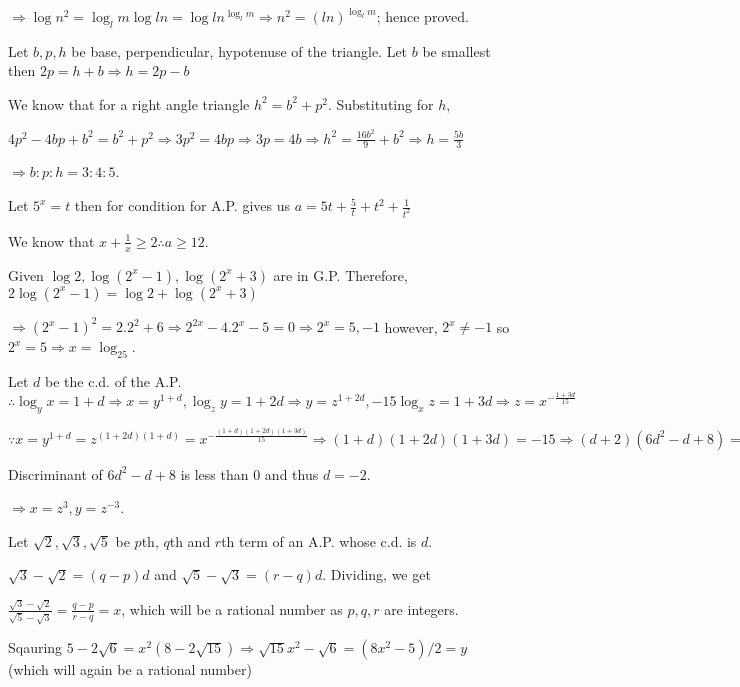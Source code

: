   $\Rightarrow \log n^2 = \log_lm\log ln = \log ln^{\log_lm} \Rightarrow n^2 = (ln)^{\log_lm}$; hence
  proved.
\item Let $b, p, h$ be base, perpendicular, hypotenuse of the triangle. Let $b$ be smallest then $2p = h +
  b \Rightarrow h = 2p - b$

  We know that for a right angle triangle $h^2 = b^2 + p^2$. Substituting for $h$,

  $4p^2 - 4bp + b^2 = b^2 + p^2 \Rightarrow 3p^2 = 4bp \Rightarrow 3p = 4b \Rightarrow h^2 = \frac{16b^2}{9}
  + b^2 \Rightarrow h = \frac{5b}{3}$

  $\Rightarrow b:p:h = 3:4:5$.
\item Let $5^x = t$ then for condition for A.P. gives us $a = 5t + \frac{5}{t} + t^2 + \frac{1}{t^2}$

  We know that $x + \frac{1}{x} \geq 2 \therefore a \geq 12$.
\item Given $\log 2, \log(2^x - 1), \log(2^x + 3)$ are in G.P. Therefore, $2\log(2^x - 1) = \log 2 +
  \log(2^x + 3)$

  $\Rightarrow (2^x - 1)^2 = 2.2^2 + 6 \Rightarrow 2^{2x} - 4.2^x - 5 = 0 \Rightarrow 2^x = 5, -1$ however,
  $2^x \neq -1$ so $2^x = 5 \Rightarrow x = \log_25$.
\item Let $d$ be the c.d. of the A.P. $\therefore \log_yx = 1 + d \Rightarrow x = y^{1 + d}, \log_zy = 1 +
  2d \Rightarrow y = z^{1 + 2d}, -15\log_xz = 1 + 3d \Rightarrow z = x^{-\tfrac{1 + 3d}{15}}$

  $\because x = y^{1 + d} = z^{(1 + 2d)(1 + d)} = x^{-\tfrac{(1 + d)(1 + 2d)(1 + 3d)}{15}} \Rightarrow (1 +
  d)(1 + 2d)(1 + 3d) = -15 \Rightarrow (d + 2)(6d^2 - d + 8) = 0$

  Discriminant of $6d^2 -d + 8$ is less than $0$ and thus $d = -2$.

  $\Rightarrow x = z^3, y = z^{-3}$.
\item Let $\sqrt{2}, \sqrt{3}, \sqrt{5}$ be $p$th, $q$th and $r$th term of an A.P. whose c.d. is $d$.

  $\sqrt{3} - \sqrt{2} = (q - p)d$ and $\sqrt{5} - \sqrt{3} = (r - q)d$. Dividing, we get

  $\frac{\sqrt{3} - \sqrt{2}}{\sqrt{5} - \sqrt{3}} = \frac{q - p}{r - q} = x$, which will be a rational
  number as $p, q, r$ are integers.

  Sqauring $5 - 2\sqrt{6} = x^2(8 - 2\sqrt{15})\Rightarrow \sqrt{15}x^2 - \sqrt{6} = (8x^2 - 5)/2 = y$
  (which will again be a rational number)

